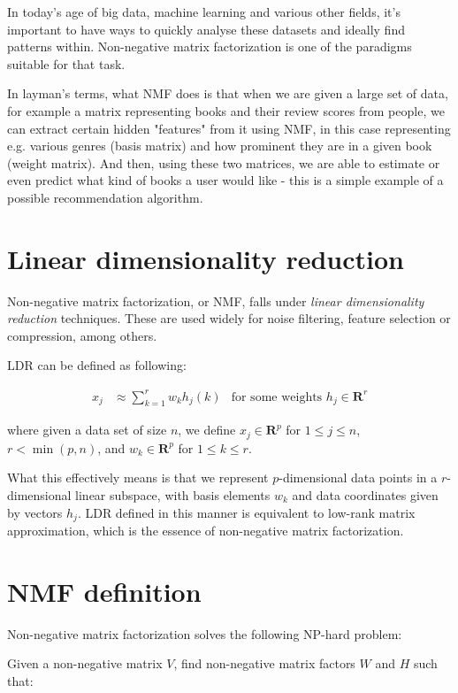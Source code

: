 In today's age of big data, machine learning and various other fields, it's important to have ways to quickly analyse these datasets and ideally find patterns within. Non-negative matrix factorization is one of the paradigms suitable for that task.

In layman's terms, what NMF does is that when we are given a large set of data, for example a matrix representing books and their review scores from people, we can extract certain hidden "features" from it using NMF, in this case representing e.g. various genres (basis matrix) and how prominent they are in a given book (weight matrix). And then, using these two matrices, we are able to estimate or even predict what kind of books a user would like - this is a simple example of a possible recommendation algorithm.

\section{Linear dimensionality reduction}
Non-negative matrix factorization, or NMF, falls under \emph{linear dimensionality reduction} techniques. These are used widely for noise filtering, feature selection or compression, among others.

LDR can be defined as following: \cite{nmf_why_how}

\begin{align}
x_j &\approx \sum_{k=1}^{r}w_kh_j(k) &\text{for some weights $h_j \in \mathbf{R}^r$}
\end{align}

where given a data set of size $n$, we define $x_j \in \mathbf{R}^p$ for $1 \leq j \leq n$, $r < \min(p,n)$, and $w_k \in \mathbf{R}^p$ for $1 \leq k \leq r$.

What this effectively means is that we represent $p$-dimensional data points in a $r$-dimensional linear subspace, with basis elements $w_k$ and data coordinates given by vectors $h_j$. LDR defined in this manner is equivalent to low-rank matrix approximation, which is the essence of non-negative matrix factorization.

\section{NMF definition}
Non-negative matrix factorization solves the following NP-hard problem:

Given a non-negative matrix $V$, find non-negative matrix factors $W$ and $H$ such that:

